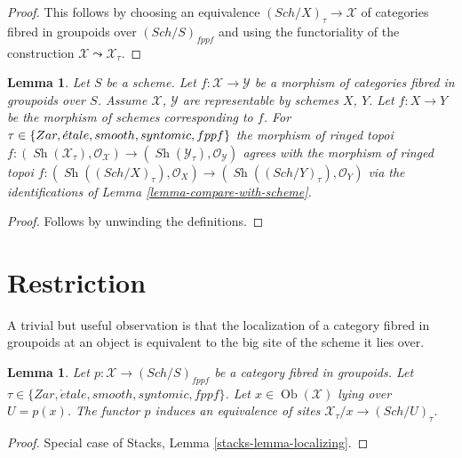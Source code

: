 \documentclass{stacks-project}
\theoremstyle{plain}
\newtheorem{lemma}[subsection]{Lemma}
\theoremstyle{definition}
\theoremstyle{remark}
\numberwithin{equation}{subsection}
\def\Sch{\mathit{Sch}}
\def\Ob{\mathop{\mathrm{Ob}}\nolimits}
\def\Sh{\mathop{\mathit{Sh}}\nolimits}
\def\etale{{\acute{e}tale}}
\begin{document}
\begin{proof}
This follows by choosing an equivalence
$(\Sch/X)_\tau \to \mathcal{X}$ of categories fibred in groupoids
over $(\Sch/S)_{fppf}$ and using the functoriality of
the construction $\mathcal{X} \leadsto \mathcal{X}_\tau$.
\end{proof}

\begin{lemma}
\label{lemma-compare-with-morphism-of-schemes}
Let $S$ be a scheme. Let $f : \mathcal{X} \to \mathcal{Y}$ be a morphism
of categories fibred in groupoids over $S$.
Assume $\mathcal{X}$, $\mathcal{Y}$ are representable by schemes
$X$, $Y$. Let $f : X \to Y$ be the morphism of schemes corresponding
to $f$. For $\tau \in \{Zar,\linebreak[0] \etale,\linebreak[0]
smooth,\linebreak[0] syntomic,\linebreak[0] fppf\}$
the morphism of ringed topoi
$f : (\Sh(\mathcal{X}_\tau), \mathcal{O}_\mathcal{X}) \to
(\Sh(\mathcal{Y}_\tau), \mathcal{O}_\mathcal{Y})$
agrees with the morphism of ringed topoi
$f : (\Sh((\Sch/X)_\tau), \mathcal{O}_X) \to 
(\Sh((\Sch/Y)_\tau), \mathcal{O}_Y)$ via the identifications of
Lemma \ref{lemma-compare-with-scheme}.
\end{lemma}

\begin{proof}
Follows by unwinding the definitions.
\end{proof}




\section{Restriction}
\label{section-restriction}


\noindent
A trivial but useful observation is that the localization
of a category fibred in groupoids at an object
is equivalent to the big site of the scheme it lies over.

\begin{lemma}
\label{lemma-localizing}
Let $p : \mathcal{X} \to (\Sch/S)_{fppf}$ be a category fibred
in groupoids. Let $\tau \in \{Zar, \etale, smooth, syntomic, fppf\}$.
Let $x \in \Ob(\mathcal{X})$ lying over $U = p(x)$.
The functor $p$ induces an equivalence of sites
$\mathcal{X}_\tau/x \to (\Sch/U)_\tau$.
\end{lemma}

\begin{proof}
Special case of Stacks, Lemma \ref{stacks-lemma-localizing}.
\end{proof}
\end{document}
